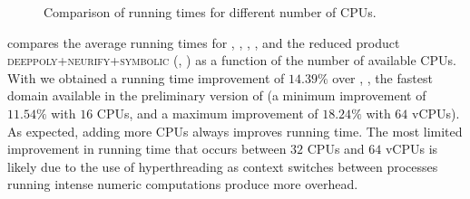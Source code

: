\begin{figure}[t]
\begin{tikzpicture}


  \end{tikzpicture}
  \caption{Comparison of running times for different number of CPUs.}
  \end{figure}

 compares the average running times for \boxes, \symbolic, \deeppoly, \neurify, and the reduced product \textsc{deeppoly+neurify+symbolic} (\ie, \reducedproduct) as a function of the number of available CPUs.
%
%
With \reducedproduct{} we obtained a running time improvement of $14.39\%$ over \symbolic, \ie, the fastest domain available in the preliminary version of \libra{} (a minimum improvement of $11.54\%$ with $16$ CPUs, and a maximum improvement of $18.24\%$ with $64$ vCPUs).
%
As expected, adding more CPUs always improves \libra{} running time. The most limited improvement in running time that occurs between $32$ CPUs and $64$ vCPUs is likely due to the use of hyperthreading as context switches between processes running intense numeric computations produce more overhead.
%

